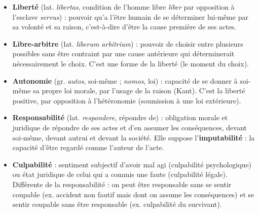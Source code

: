 \documentclass[11pt]{article}
\begin{document}
\begin{definition}
\begin{itemize}
\item \textbf{Liberté} (lat. \emph{libertas}, condition de l'homme libre \emph{liber} par opposition à l'esclave \emph{servus}) : pouvoir qu'a l'être humain de se déterminer lui-même par sa volonté et sa raison, c'est-à-dire d'être la cause première de ses actes.
\item \textbf{Libre-arbitre} (lat. \emph{liberum arbitrium}) : pouvoir de choisir entre plusieurs possibles sans être contraint par une cause antérieure qui déterminerait nécessairement le choix. C'est une forme de la liberté (le moment du choix).
\item \textbf{Autonomie} (gr. \emph{autos}, soi-même ; \emph{nomos}, loi) : capacité de se donner à soi-même sa propre loi morale, par l'usage de la raison (Kant). C'est la liberté positive, par opposition à l'hétéronomie (soumission à une loi extérieure).
\end{itemize}
\end{definition}

\begin{definition}
\begin{itemize}
\item \textbf{Responsabilité} (lat. \emph{respondere}, répondre de) : obligation morale et juridique de répondre de ses actes et d'en assumer les conséquences, devant soi-même, devant autrui et devant la société. Elle suppose l'\textbf{imputabilité} : la capacité d'être regardé comme l'auteur de l'acte.
\item \textbf{Culpabilité} : sentiment subjectif d'avoir mal agi (culpabilité psychologique) ou état juridique de celui qui a commis une faute (culpabilité légale). Différente de la responsabilité : on peut être responsable sans se sentir coupable (ex. accident non fautif mais dont on assume les conséquences) et se sentir coupable sans être responsable (ex. culpabilité du survivant).
\end{itemize}
\end{definition}
\end{document}
